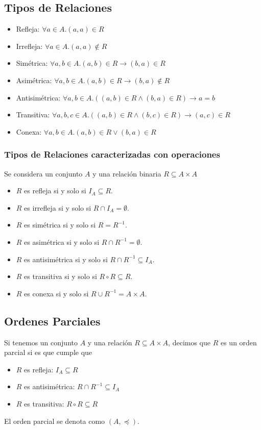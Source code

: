 \documentclass[../main.tex]{subfiles}
\begin{document}
\subsection{Tipos de Relaciones}
\begin{itemize}
    \item Refleja: $\forall a \in A . (a,a) \in R$
    \item Irrefleja: $\forall a \in A . (a,a) \not\in R$
    \item Simétrica: $\forall a, b \in A . (a,b) \in R \rightarrow (b,a) \in R$
    \item Asimétrica: $\forall a, b \in A . (a,b) \in R \rightarrow (b,a) \not\in R$
    \item Antisimétrica: $\forall a, b \in A . ((a,b) \in R \wedge (b,a) \in R) \rightarrow a = b$
    \item Transitiva: $\forall a, b, c \in A . ((a,b) \in R \wedge (b,c) \in R) \rightarrow (a,c) \in R$
    \item Conexa: $\forall a, b \in A . (a,b) \in R \vee (b,a) \in R$
\end{itemize}

\subsubsection{Tipos de Relaciones caracterizadas con operaciones}
Se considera un conjunto $A$ y una relación binaria $R \subseteq A \times A$
\begin{itemize}
    \item $R$ es refleja si y solo si $I_A \subseteq R$.
    \item $R$ es irrefleja si y solo si $R \cap I_A = \emptyset$.
    \item $R$ es simétrica si y solo si $R = R^{-1}$.
    \item $R$ es asimétrica si y solo si $R \cap R^{-1} = \emptyset$.
    \item $R$ es antisimétrica si y solo si $R \cap R^{-1} \subseteq I_A$.
    \item $R$ es transitiva si y solo si $R \circ R \subseteq R$.
    \item $R$ es conexa si y solo si $R \cup R^{-1} = A \times A$.
\end{itemize}

\subsection{Ordenes Parciales}
Si tenemos un conjunto $A$ y una relación $R \subseteq A \times A$, decimos que $R$ es un orden parcial si es que cumple que
\begin{itemize}
    \item $R$ es refleja: $I_A \subseteq R$
    \item $R$ es antisimétrica: $R \cap R^{-1} \subseteq I_A$
    \item $R$ es transitiva: $R \circ R \subseteq R$
\end{itemize}
El orden parcial se denota como $(A, \preceq)$.
\end{document}
